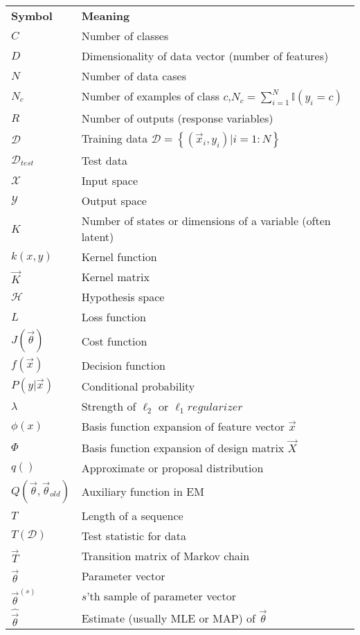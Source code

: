 {\begin{english}
\begin{longtable}{ll}
\hline\noalign{\smallskip}
\textbf{Symbol} & \textbf{Meaning} \\
\noalign{\smallskip}\hline\noalign{\smallskip}
$C$ & Number of classes\\
$D$ & Dimensionality of data vector (number of features)\\
$N$ & Number of data cases\\
$N_c$ & Number of examples of class $c$,$N_c=\sum_{i=1}^{N}\mathbb{I}(y_i=c)$\\
$R$ & Number of outputs (response variables)\\
$\mathcal{D}$ & Training data $\mathcal{D}=\left\{(\vec{x}_i,y_i) | i=1:N\right\}$\\
$\mathcal{D}_{test}$ & Test data\\
$\mathcal{X}$ & Input space\\
$\mathcal{Y}$ & Output space\\
$K$ & Number of states or dimensions of a variable (often latent)\\
$k(x,y)$ & Kernel function\\
$\vec{K}$ & Kernel matrix\\
$\mathcal{H}$ & Hypothesis space\\
$L$ & Loss function \\
$J(\vec{\theta})$ & Cost function\\
$f(\vec{x})$ & Decision function\\
$P(y|\vec{x})$ & Conditional probability\\
$\lambda$ & Strength of $\ell_2$ or $\ell_1 regularizer$\\
$\phi(x)$ & Basis function expansion of feature vector $\vec{x}$\\
$\Phi$ & Basis function expansion of design matrix $\vec{X}$\\
$q()$ & Approximate or proposal distribution\\
$Q(\vec{\theta},\vec{\theta}_{old})$ & Auxiliary function in EM\\
$T$ & Length of a sequence\\
$T(\mathcal{D})$ & Test statistic for data\\
$\vec{T}$ & Transition matrix of Markov chain\\
$\vec{\theta}$ & Parameter vector\\
$\vec{\theta}^{(s)}$ & $s$'th sample of parameter vector\\
$\hat{\vec{\theta}}$ & Estimate (usually MLE or MAP) of $\vec{\theta}$\\

\end{longtable}
\end{english}}
